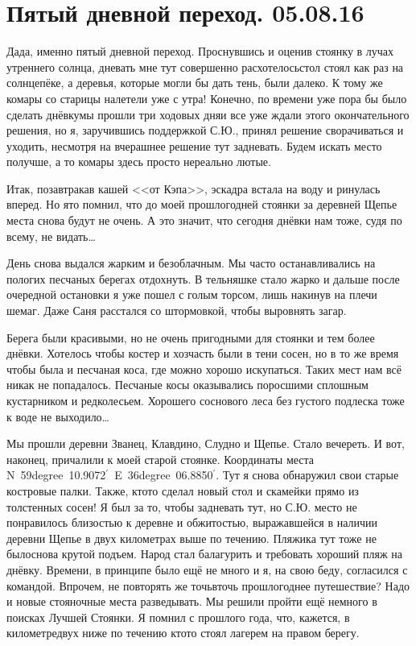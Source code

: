 \chapter{Пятый дневной переход. 05.08.16} 

Да\sdash да, именно пятый дневной переход. Проснувшись и оценив стоянку в лучах утреннего солнца, дневать мне тут совершенно расхотелось\mdash стол стоял как раз на солнцепёке, а деревья, которые могли бы дать тень, были далеко. К тому же комары со старицы налетели уже с утра! Конечно, по времени уже пора бы было сделать днёвку\mdash мы прошли три ходовых дня\mdash и все уже ждали этого окончательного решения, но я, заручившись поддержкой С.Ю., принял решение сворачиваться и уходить, несмотря на вчерашнее решение тут задневать. Будем искать место получше, а то комары здесь просто нереально лютые.

Итак, позавтракав кашей <<от Кэпа>>, эскадра встала на воду и ринулась вперед. Но я\sdash то помнил, что до моей прошлогодней стоянки за деревней Щепье места снова будут не очень. А это значит, что сегодня днёвки нам тоже, судя по всему, не видать\ldots 

День снова выдался жарким и безоблачным. Мы часто останавливались на пологих песчаных берегах отдохнуть. В тельняшке стало жарко и дальше после очередной остановки я уже пошел с голым торсом, лишь накинув на плечи шемаг. Даже Саня расстался со штормовкой, чтобы выровнять загар. 

Берега были красивыми, но не очень пригодными для стоянки и тем более днёвки. Хотелось чтобы костер и хозчасть были в тени сосен, но в то же время чтобы была и песчаная коса, где можно хорошо искупаться. Таких мест нам всё никак не попадалось. Песчаные косы оказывались поросшими сплошным кустарником и редколесьем. Хорошего соснового леса без густого подлеска тоже к воде не выходило\ldots 

Мы прошли деревни Званец, Клавдино, Слудно и Щепье. Стало вечереть. И вот, наконец, причалили к моей старой стоянке. Координаты места N~59degree~10.9072$^\prime$~E~36degree~06.8850$^\prime$. Тут я снова обнаружил свои старые костровые палки. Также, кто\sdash то сделал новый стол и скамейки прямо из толстенных сосен! Я был за то, чтобы задневать тут, но С.Ю. место не понравилось близостью к деревне и обжитостью, выражавшейся в наличии деревни Щепье в двух километрах выше по течению. Пляжика тут тоже не было\mdash снова крутой подъем. Народ стал балагурить и требовать хороший пляж на днёвку. Времени, в принципе было ещё не много и я, на свою беду, согласился с командой. Впрочем, не повторять же точь\sdash в\sdash точь прошлогоднее путешествие? Надо и новые стояночные места разведывать. Мы решили пройти ещё немного в поисках Лучшей Стоянки. Я помнил с прошлого года, что, кажется, в километре\sdash двух ниже по течению кто\sdash то стоял лагерем на правом берегу.


